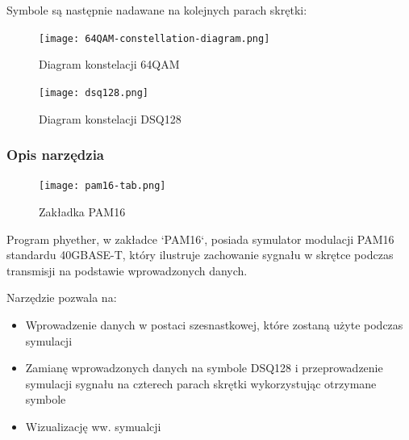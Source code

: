 Symbole są następnie nadawane na kolejnych parach skrętki:
\begin{table}[h]
    \centering
\end{table}

\begin{figure}[h]
    \centering
    \texttt{[image: 64QAM-constellation-diagram.png]}
    \caption{Diagram konstelacji 64QAM}
    \label{fig:lab-64QAM}
\end{figure}

\begin{figure}[h]
    \centering
    \texttt{[image: dsq128.png]}
    \caption{Diagram konstelacji DSQ128}
    \label{fig:lab-dsq128}
\end{figure}

\clearpage

\subsubsection{Opis narzędzia}

\begin{figure}[ht]
    \centering
    \texttt{[image: pam16-tab.png]}
    \caption{Zakładka PAM16}
    \label{fig:zakladka_pam16}
\end{figure}

Program phyether, w zakładce `PAM16`, posiada symulator modulacji PAM16 standardu 40GBASE-T, który ilustruje zachowanie
sygnału w skrętce podczas transmisji na podstawie wprowadzonych danych.

Narzędzie pozwala na:
\begin{itemize}
    \item Wprowadzenie danych w postaci szesnastkowej, które zostaną użyte podczas symulacji
    \item Zamianę wprowadzonych danych na symbole DSQ128 i przeprowadzenie symulacji sygnału na czterech parach skrętki 
        wykorzystując otrzymane symbole
    \item Wizualizację ww. symualcji
\end{itemize}

